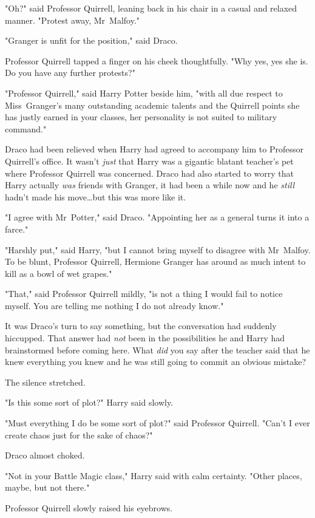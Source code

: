 "Oh?" said Professor Quirrell, leaning back in his chair in a casual and
relaxed manner. "Protest away, Mr~Malfoy."

"Granger is unfit for the position," said Draco.

Professor Quirrell tapped a finger on his cheek thoughtfully. "Why yes, yes she
is. Do you have any further protests?"

"Professor Quirrell," said Harry Potter beside him, "with all due respect to
Miss~Granger's many outstanding academic talents and the Quirrell points she
has justly earned in your classes, her personality is not suited to military
command."

Draco had been relieved when Harry had agreed to accompany him to Professor
Quirrell's office. It wasn't \emph{just} that Harry was a gigantic blatant
teacher's pet where Professor Quirrell was concerned. Draco had also started to
worry that Harry actually \emph{was} friends with Granger, it had been a while
now and he \emph{still} hadn't made his move…but this was more like it.

"I agree with Mr~Potter," said Draco. "Appointing her as a general turns it
into a farce."

"Harshly put," said Harry, "but I cannot bring myself to disagree with
Mr~Malfoy. To be blunt, Professor Quirrell, Hermione Granger has around as
much intent to kill as a bowl of wet grapes."

"That," said Professor Quirrell mildly, "is not a thing I would fail to notice
myself. You are telling me nothing I do not already know."

It was Draco's turn to say something, but the conversation had suddenly
hiccupped. That answer had \emph{not} been in the possibilities he and Harry
had brainstormed before coming here. What \emph{did} you say after the teacher
said that he knew everything you knew and he was still going to commit an
obvious mistake?

The silence stretched.

"Is this some sort of plot?" Harry said slowly.

"Must everything I do be some sort of plot?" said Professor Quirrell. "Can't I
ever create chaos just for the sake of chaos?"

Draco almost choked.

"Not in your Battle Magic class," Harry said with calm certainty. "Other
places, maybe, but not there."

Professor Quirrell slowly raised his eyebrows.

